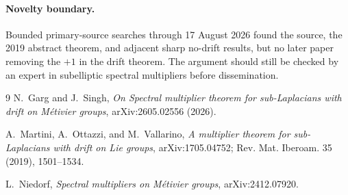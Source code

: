 \documentclass[10pt,a4paper]{article}
\begin{document}
\paragraph{Novelty boundary.}
Bounded primary-source searches through 17 August 2026 found the source,
the 2019 abstract theorem, and adjacent sharp no-drift results, but no later
paper removing the $+1$ in the drift theorem.  The argument should still be
checked by an expert in subelliptic spectral multipliers before dissemination.

\begin{thebibliography}{9}\small
{}
N.~Garg and J.~Singh,
\emph{On Spectral multiplier theorem for sub-Laplacians with drift on
Métivier groups}, arXiv:2605.02556 (2026).

A.~Martini, A.~Ottazzi, and M.~Vallarino,
\emph{A multiplier theorem for sub-Laplacians with drift on Lie groups},
arXiv:1705.04752; Rev. Mat. Iberoam. 35 (2019), 1501--1534.

L.~Niedorf,
\emph{Spectral multipliers on Métivier groups}, arXiv:2412.07920.
\end{thebibliography}
\end{document}
